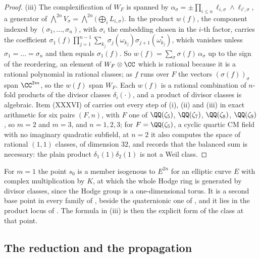 \begin{proof}
(iii) The complexification of $W_{F}$ is spanned by
$\alpha_{\sigma}=\pm\prod_{i\le n}\ell_{i,\sigma}\wedge\ell_{i',\sigma}$, a
generator of $\bigwedge^{2n}V_{\sigma}=\bigwedge^{2n}\bigl(\bigoplus_{i}L_{i,\sigma}\bigr)$.
In the product $w(f)$, the component indexed by $(\sigma_{1},\dots,\sigma_{n})$,
with $\sigma_{i}$ the embedding chosen in the $i$-th factor, carries the
coefficient
$\sigma_{1}(f)\prod_{j=1}^{n-1}\sum_{k_{j}}\sigma_{j}(\omega_{k_{j}})\sigma_{j+1}(\omega_{k_{j}}^{*})$,
which vanishes unless $\sigma_{1}=\dots=\sigma_{n}$ and then equals
$\sigma_{1}(f)$. So $w(f)=\sum_{\sigma}\sigma(f)\,\alpha_{\sigma}$ up to the
sign of the reordering, an element of $W_{F}\otimes\CC$ which is rational
because it is a rational polynomial in rational classes; as $f$ runs over
$F$ the vectors $(\sigma(f))_{\sigma}$ span $\CC^{2m}$, so the $w(f)$ span
$W_{F}$. Each $w(f)$ is a rational combination of $n$-fold products of the
divisor classes $\delta_{i}(\cdot)$, and a product of divisor classes is
algebraic. Item (XXXVI) of  carries out every step of (i), (ii)
and (iii) in exact arithmetic for six pairs $(F,n)$, with $F$ one of
$\QQ(\zeta_{5})$, $\QQ(\zeta_{7})$, $\QQ(\zeta_{8})$, $\QQ(\zeta_{9})$, so
$m=2$ and $m=3$, and $n=1,2,3$; for $F=\QQ(\zeta_{5})$, a cyclic quartic CM
field with no imaginary quadratic subfield, at $n=2$ it also computes the
space of rational $(1,1)$ classes, of dimension $32$, and records that the
balanced sum is necessary: the plain product $\delta_{1}(1)\delta_{2}(1)$ is
not a Weil class.
\end{proof}

\begin{remark}\label{rem:cmquadratic}
For $m=1$ the point $s_{0}$ is a member isogenous to $E^{2n}$ for an elliptic
curve $E$ with complex multiplication by $K$, at which the whole Hodge ring
is generated by divisor classes, since the Hodge group is a one-dimensional
torus. It is a second base point in every family of ,
beside the quaternionic one of , and it lies in the
product locus of . The formula in (iii) is then the explicit
form of the class at that point.
\end{remark}

\subsection{The reduction and the propagation}

